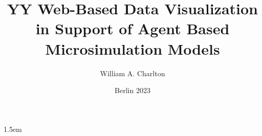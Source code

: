 
\newcommand*{\Title}{YY Web-Based Data Visualization in Support of Agent Based Microsimulation Models}

\newcommand*{\Autor}{William A. Charlton}
\newcommand*{\Datum}{Berlin 2023}
\title{\Title}
\author{\Autor}
\date{\Datum}

\newcommand{\tfk}[1]{\textsl{\texttt{#1}}}
\newcommand{\fett}[1]{\textbf{#1}}
\newcommand{\kursiv}[1]{\textit{#1}}
\newcommand{\pbb}{\parbox}
\newcommand{\sst}{\scriptstyle}


\providecommand{\tightlist}{%
  \setlength{\itemsep}{0pt}\setlength{\parskip}{0pt}}

\def\umbruch{\clearpage}



\frenchspacing								%
\setlength{\parindent}{1.5ex}						%
\setlength{\parskip}{0.25ex plus0.25ex minus 0.25ex}	%



\emergencystretch 1.5em %
\hfuzz 0.3pt
\vfuzz \hfuzz
\raggedbottom
{}						%

\setlength{\headheight}{1cm} 					%
\addtolength{\footnotesep}{2pt}					%

\setcounter{secnumdepth}{3}					%
\setcounter{figure}{4}							%
\setcounter{tocdepth}{1}						%

